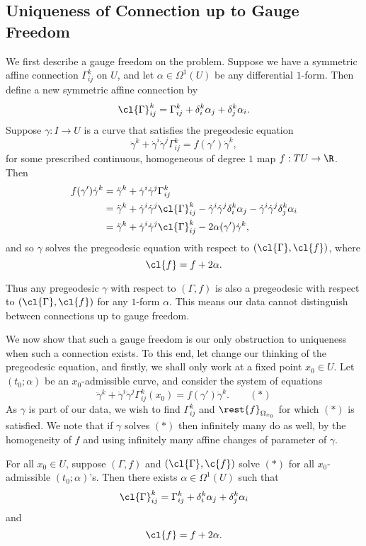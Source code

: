 \subsection{Uniqueness of Connection up to Gauge Freedom}

We first describe a gauge freedom on the problem.  Suppose we have a symmetric affine connection $\Gamma_{ij}^k$ on $U$, and let $\alpha\in\Omega^1(U)$ be any differential $1$-form.  Then define a new symmetric affine connection by
$$\cl{\Gamma}_{ij}^k=\Gamma_{ij}^k+\delta_i^k\alpha_j+\delta_j^k\alpha_i.$$
Suppose $\gamma:I\to U$ is a curve that satisfies the pregeodesic equation
$$\ddot{\gamma}^k+\dot{\gamma}^i\dot{\gamma}^j\Gamma_{ij}^k=f(\gamma')\dot{\gamma}^k,$$
for some prescribed continuous, homogeneous of degree $1$ map $f:TU\to\R$.  Then
\begin{align*}
	f(\gamma')\dot{\gamma}^k&=\ddot{\gamma}^k+\dot{\gamma}^i\dot{\gamma}^j\Gamma_{ij}^k\\
	&=\ddot{\gamma}^k+\dot{\gamma}^i\dot{\gamma}^j\cl{\Gamma}_{ij}^k-\dot{\gamma}^i\dot{\gamma}^j\delta_i^k\alpha_j-\dot{\gamma}^i\dot{\gamma}^j\delta_j^k\alpha_i\\
	&=\ddot{\gamma}^k+\dot{\gamma}^i\dot{\gamma}^j\cl{\Gamma}_{ij}^k-2\alpha(\gamma')\dot{\gamma}^k,
\end{align*}
and so $\gamma$ solves the pregeodesic equation with respect to $(\cl{\Gamma},\cl{f})$, where
$$\cl{f}=f+2\alpha.$$

Thus any pregeodesic $\gamma$ with respect to $(\Gamma,f)$ is also a pregeodesic with respect to $(\cl{\Gamma},\cl{f})$ for any $1$-form $\alpha$.  This means our data cannot distinguish between connections up to gauge freedom.

We now show that such a gauge freedom is our only obstruction to uniqueness when such a connection exists.  To this end, let change our thinking of the pregeodesic equation, and firstly, we shall only work at a fixed point $x_0\in U$.  Let $(t_0;\alpha)$ be an $x_0$-admissible curve, and consider the system of equations
$$\ddot{\gamma}^k+\dot{\gamma}^i\dot{\gamma}^j\Gamma_{ij}^k(x_0)=f(\gamma')\dot{\gamma}^k.\qquad (*)$$
As $\gamma$ is part of our data, we wish to find $\Gamma_{ij}^k$ and $\rest{f}_{\Omega_{x_0}}$ for which $(*)$ is satisfied.  We note that if $\gamma$ solves $(*)$ then infinitely many do as well, by the homogeneity of $f$ and using infinitely many affine changes of parameter of $\gamma$.  


\begin{prop}
    For all $x_0\in U$, suppose $(\Gamma,f)$ and $(\cl{\Gamma},\c{f})$ solve $(*)$ for all $x_0$-admissible $(t_0;\alpha)$'s.  Then there exists $\alpha\in\Omega^1(U)$ such that
    $$\cl{\Gamma}_{ij}^k=\Gamma_{ij}^k+\delta_i^k\alpha_j+\delta_j^k\alpha_i$$
    and
    $$\cl{f}=f+2\alpha.$$
\end{prop}

